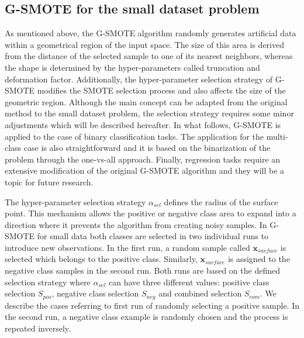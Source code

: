 \documentclass[parskip=full]{scrartcl}
\begin{document}
\subsection{G-SMOTE for the small dataset problem}

As mentioned above, the G-SMOTE algorithm randomly generates artificial data within a geometrical 
region of the input space. The size of this area is derived from the distance of the selected sample to 
one of its nearest neighbors, whereas the shape is determined by the hyper-parameters called 
truncation and deformation factor. Additionally, the hyper-parameter selection strategy of G-SMOTE 
modifies the SMOTE selection process and also affects the size of the geometric region. Although the 
main concept can be adapted from the original method to the small dataset problem, the selection 
strategy requires some minor adjustments which will be described hereafter. In what follows, G-SMOTE 
is applied to the case of binary classification tasks. The application for the multi-class case is also 
straightforward and it is based on the binarization of the problem through the one-vs-all approach. 
Finally, regression tasks require an extensive modification of the original G-SMOTE algorithm and they 
will be a topic for future research.

The hyper-parameter selection strategy \( \alpha_{sel} \) defines the radius of 
the surface point. This mechanism allows the positive or negative class area to 
expand into a direction where it prevents the algorithm from creating noisy 
samples. In G-SMOTE for small data both classes are selected in two individual 
runs to introduce new observations. In the first run, a random sample called 
\( \textbf{x}_{surface} \) is selected which belongs to the positive class. 
Similarly, \( \textbf{x}_{surface} \) is assigned to the negative class 
samples in the second run. Both runs are based on the defined selection 
strategy where \( \alpha_{sel} \) can have three different values: positive 
class selection \( S_{pos} \), negative class selection \( S_{neg} \) and 
combined selection \( S_{com} \). We describe the cases referring to first run 
of randomly selecting a positive sample. In the second run, a negative class 
example is randomly chosen and the process is repeated inversely. 
\end{document}
